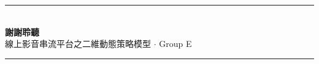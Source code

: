 \documentclass[aspectratio=169,11pt,fontset=none]{ctexbeamer}
\begin{document}
\begin{frame}[plain]
  \vfill\centering
  {\color{rblue}\rule{0.5\textwidth}{1.4pt}}\\[0.8em]
  {\Large\bfseries\color{rblue} 謝謝聆聽}\\[0.6em]
  {\footnotesize\color{black!70} 線上影音串流平台之二維動態策略模型 $\cdot$ Group E}\\[0.6em]
  {\color{rblue}\rule{0.5\textwidth}{1.4pt}}
  \vfill
\end{frame}
\end{document}
